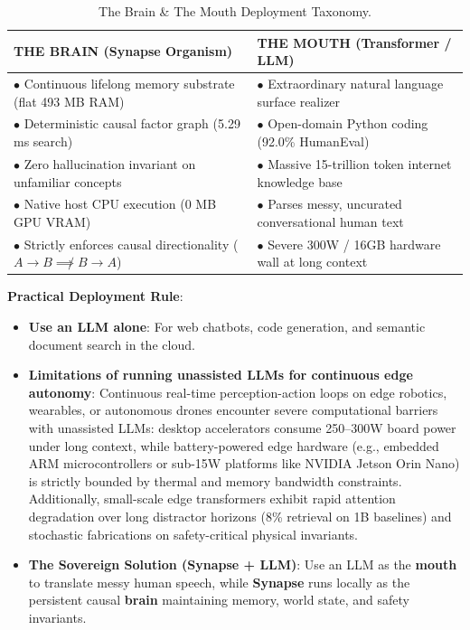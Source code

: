 \documentclass[11pt,a4paper]{article}
\begin{document}
\begin{table}[H]
\centering
\small\sffamily
{}
\begin{tabularx}{\textwidth}{X X}
\toprule
\textbf{\color{brandnavy}THE BRAIN (Synapse Organism)} & \textbf{\color{brandnavy}THE MOUTH (Transformer / LLM)} \\
\midrule
$\bullet$ Continuous lifelong memory substrate (flat 493 MB RAM) & $\bullet$ Extraordinary natural language surface realizer \\
$\bullet$ Deterministic causal factor graph (5.29 ms search) & $\bullet$ Open-domain Python coding (92.0\% HumanEval) \\
$\bullet$ Zero hallucination invariant on unfamiliar concepts & $\bullet$ Massive 15-trillion token internet knowledge base \\
$\bullet$ Native host CPU execution (0 MB GPU VRAM) & $\bullet$ Parses messy, uncurated conversational human text \\
$\bullet$ Strictly enforces causal directionality ($A \to B \not\implies B \to A$) & $\bullet$ Severe 300W / 16GB hardware wall at long context \\
\bottomrule
\end{tabularx}
\caption{The Brain \& The Mouth Deployment Taxonomy.}
\label{tab:taxonomy}
\end{table}

\textbf{Practical Deployment Rule}:
\begin{itemize}[leftmargin=1.5em, itemsep=1pt, topsep=1pt]
  \item \textbf{Use an LLM alone}: For web chatbots, code generation, and semantic document search in the cloud.
  \item \textbf{Limitations of running unassisted LLMs for continuous edge autonomy}: Continuous real-time perception-action loops on edge robotics, wearables, or autonomous drones encounter severe computational barriers with unassisted LLMs: desktop accelerators consume 250--300W board power under long context, while battery-powered edge hardware (e.g., embedded ARM microcontrollers or sub-15W platforms like NVIDIA Jetson Orin Nano) is strictly bounded by thermal and memory bandwidth constraints. Additionally, small-scale edge transformers exhibit rapid attention degradation over long distractor horizons (8\% retrieval on 1B baselines) and stochastic fabrications on safety-critical physical invariants.
  \item \textbf{The Sovereign Solution (Synapse + LLM)}: Use an LLM as the \textbf{mouth} to translate messy human speech, while \textbf{Synapse} runs locally as the persistent causal \textbf{brain} maintaining memory, world state, and safety invariants.
\end{itemize}
\end{document}
